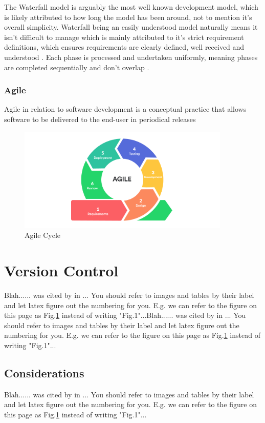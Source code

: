 The Waterfall model is arguably the most well known development model, which is likely attributed to how long the model has been around, not to mention it's overall simplicity. Waterfall being an easily understood model naturally means it isn't difficult to manage which is mainly attributed to it's strict requirement definitions, which ensures requirements are clearly defined, well received and understood \cite{WATERFALL}. Each phase is processed and undertaken uniformly, meaning phases are completed sequentially and don't overlap \cite{WATERFALL_REVIEW}.

\subsubsection{Agile}
Agile in relation to software development is a conceptual practice that allows software to be delivered to the end-user in periodical releases 

\begin{figure}[h!]
	\caption{Agile Cycle}
	\label{image:myImageName}
	\centering
	\includegraphics[width=0.9\textwidth]{images/agile.png}
\end{figure}	

\section{Version Control}
Blah...... was cited by \cite{MEAN_STACK} in ... You should refer to images and tables by their label and let latex figure out the numbering for you. E.g. we can refer to the figure on this page as Fig.\ref{image:myImageName} instead of writing "Fig.1"...Blah...... was cited by \cite{MEAN_STACK} in ... You should refer to images and tables by their label and let latex figure out the numbering for you. E.g. we can refer to the figure on this page as Fig.\ref{image:myImageName} instead of writing "Fig.1"...
\subsection{Considerations}
Blah...... was cited by \cite{MEAN_STACK} in ... You should refer to images and tables by their label and let latex figure out the numbering for you. E.g. we can refer to the figure on this page as Fig.\ref{image:myImageName} instead of writing "Fig.1"...

